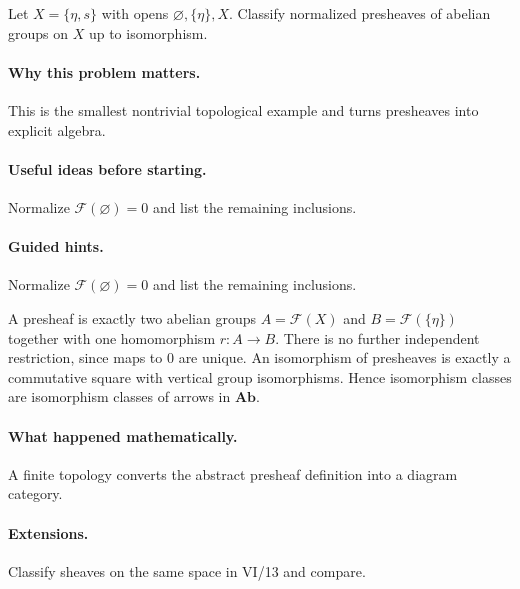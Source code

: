 \begin{problem}
Let $X=\{\eta,s\}$ with opens $\varnothing,\{\eta\},X$.  Classify normalized presheaves of abelian groups on $X$ up to isomorphism.
\end{problem}

\paragraph{Why this problem matters.}
This is the smallest nontrivial topological example and turns presheaves into explicit algebra.

\paragraph{Useful ideas before starting.}
Normalize $\mathcal F(\varnothing)=0$ and list the remaining inclusions.

\paragraph{Guided hints.}
Normalize $\mathcal F(\varnothing)=0$ and list the remaining inclusions.

\begin{solution}
A presheaf is exactly two abelian groups $A=\mathcal F(X)$ and $B=\mathcal F(\{\eta\})$ together with one homomorphism $r:A\to B$.  There is no further independent restriction, since maps to $0$ are unique.  An isomorphism of presheaves is exactly a commutative square with vertical group isomorphisms.  Hence isomorphism classes are isomorphism classes of arrows in $\mathbf{Ab}$.
\end{solution}

\paragraph{What happened mathematically.}
A finite topology converts the abstract presheaf definition into a diagram category.

\paragraph{Extensions.}
Classify sheaves on the same space in VI/13 and compare.
